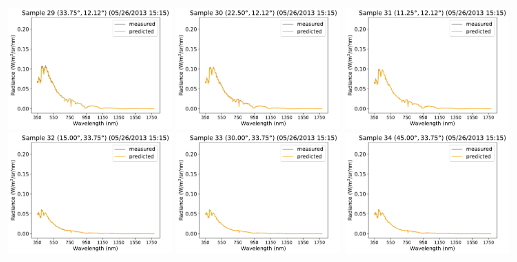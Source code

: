 \begin{center}
\includegraphics[width=0.325\textwidth]{img/05261515_s29.pdf}
\includegraphics[width=0.325\textwidth]{img/05261515_s30.pdf}
\includegraphics[width=0.325\textwidth]{img/05261515_s31.pdf}\\
\includegraphics[width=0.325\textwidth]{img/05261515_s32.pdf}
\includegraphics[width=0.325\textwidth]{img/05261515_s33.pdf}
\includegraphics[width=0.325\textwidth]{img/05261515_s34.pdf}\\

\end{center}
